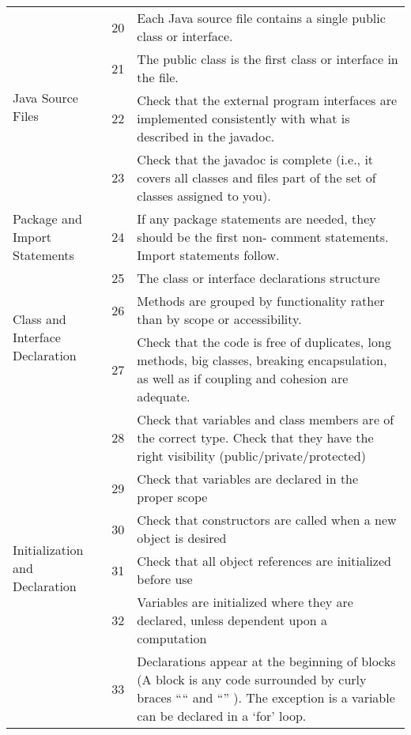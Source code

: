 \documentclass[11pt, a4paper,titlepage]{article}
\begin{document}
									\begin{tabularx}{\textwidth}{| X | l | X |}
										\hline
	\multirow{4}{*}{Java Source Files} 	& \label{itm:20} 20 &  
										Each Java source file contains a single public class or interface.
										\\	\cline{2-3}
										& \label{itm:21} 21 &  
										The public class is the first class or interface in the file.
										\\	\cline{2-3}
										& \label{itm:22} 22 &  
										Check that the external program interfaces are implemented consistently
										with what is described in the javadoc.
										\\	\cline{2-3}	
										& \label{itm:23} 23 &  
										Check that the javadoc is complete (i.e., it covers all classes and files part
										of the set of classes assigned to you).
										\\   \hline
	\multirow{1}{*}{Package and Import Statements} 	& \label{itm:24} 24 &  
										If any package statements are needed, they should be the first non-
										comment statements. Import statements follow.
										\\	\hline
	\multirow{3}{*}{Class and Interface Declaration}& \label{itm:25} 25 &  
										The class or interface declarations structure
										\\	\cline{2-3}
										& \label{itm:26} 26 &  
										Methods are grouped by functionality rather than by scope or
										accessibility.
										\\	\cline{2-3}
										& \label{itm:27} 27 & 
										Check that the code is free of duplicates, long methods, big classes,
										breaking encapsulation, as well as if coupling and cohesion are adequate.
										 \\   \hline
	\multirow{6}{*}{Initialization and Declaration}	& \label{itm:28} 28 &  
										Check that variables and class members are of the correct type. Check that
										they have the right visibility (public/private/protected)
										\\	\cline{2-3}
										& \label{itm:29} 29 &  
										Check that variables are declared in the proper scope
										\\	\cline{2-3}
										& \label{itm:30} 30 &  
										Check that constructors are called when a new object is desired
										\\	\cline{2-3}
										& \label{itm:31} 31 &  
										Check that all object references are initialized before use
										\\	\cline{2-3}
										& \label{itm:32} 32 &  
										Variables are initialized where they are declared, unless dependent upon
										a computation
										\\	\cline{2-3}
										& \label{itm:33} 33 &  
										Declarations appear at the beginning of blocks (A block is any code
										surrounded by curly braces “{“ and “}” ). The exception is a variable can
										be declared in a ‘for’ loop.
										\\   \hline
										
									\end{tabularx}
									
\end{document}
